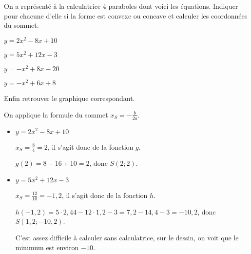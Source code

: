 \begin{exo}[title=sans calculatrice]

On a représenté à la calculatrice 4 paraboles dont voici les équations. Indiquer pour chacune d'elle si la forme est convexe ou concave et calculer les coordonnées du sommet.

\begin{multicols}{2}
$y=2x^2-8x+10$

$y=5x^2+12x-3$

$y=-x^2+8x-20$

$y=-x^2+6x+8$
\end{multicols}

 Enfin retrouver le graphique correspondant.




\begin{sol*}
On applique la formule du sommet $x_S=-\frac{b}{2a}$.
\begin{itemize}
\item $y=2x^2-8x+10$

$x_S = \frac{8}{4} =2$, il s'agit donc de la fonction $g$.

$g(2)=8-16+10 = 2$, donc $S(2;2)$.

\item $y=5x^2+12x-3$

$x_S = \frac{12}{10} =-1,2$, il s'agit donc de la fonction $h$.

$h(-1,2)=5\cdot 2,44 -12 \cdot 1,2 -3 = 7,2-14,4-3=-10,2$, donc $S(1,2;-10,2)$.

C'est assez difficile à calculer sans calculatrice, sur le dessin, on voit que le minimum est environ $-10$.


\end{itemize}
\end{sol*}
\end{exo}
